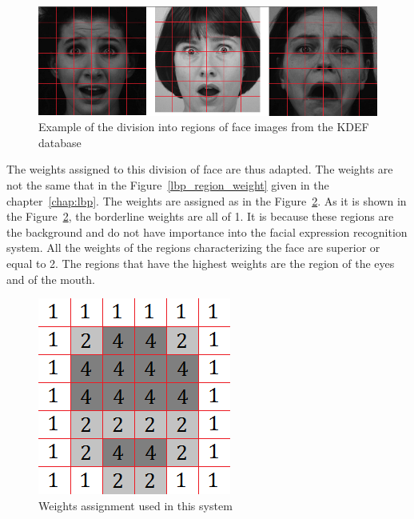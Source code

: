 \begin{figure}[!h]
\begin{center}
\noindent \includegraphics[scale=0.3]{figures/implementation_weight_example} 
\newline
\caption{Example of the division into regions of face images from the KDEF database}
\label{implementation_weight_example}
\end{center} 
\end{figure}

\noindent The weights assigned to this division of face are thus adapted. The weights are not the same that in the Figure~\ref{lbp_region_weight} given in the chapter~\ref{chap:lbp}. The weights are assigned as in the Figure~\ref{implementation_lbp_weight}. As it is shown in the Figure~\ref{implementation_lbp_weight}, the borderline weights are all of 1. It is because these regions are the background and do not have importance into the facial expression recognition system. All the weights of the regions characterizing the face are superior or equal to 2. The regions that have the highest weights are the region of the eyes and of the mouth.
\newline

\begin{figure}[!h]
\begin{center}
\noindent \includegraphics[scale=0.7]{figures/implementation_lbp_weight} 
\newline
\caption{Weights assignment used in this system}
\label{implementation_lbp_weight}
\end{center} 
\end{figure}

